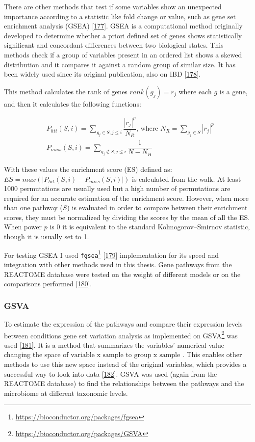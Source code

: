 \documentclass[
  12pt,
  a4paper,
  twoside,
  openright]{book}
\DeclareRobustCommand{\href}[2]{#2\footnote{\url{#1}}}
\begin{document}
There are other methods that test if some variables show an unexpected importance according to a statistic like fold change or value, such as gene set enrichment analysis (GSEA) {[}\protect\hyperlink{ref-subramanian2005}{177}{]}.
GSEA is a computational method originally developed to determine whether a priori defined set of genes shows statistically significant and concordant differences between two biological states.
This methods check if a group of variables present in an ordered list shows a skewed distribution and it compares it against a random group of similar size.
It has been widely used since its original publication, also on IBD {[}\protect\hyperlink{ref-protiva2016}{178}{]}.

This method calculates the rank of genes \(rank(g_j)=r_j\) where each \(g\) is a gene, and then it calculates the following functions:

\[
\begin{aligned}
& P_{hit}(S, i) = \sum_{g_j \in S, j \leq i}\dfrac{|r_j|^p}{N_R} \text{, where } N_R = \sum_{g_j \in S}|r_j|^p \\
& P_{miss}(S, i) = \sum_{g_j \not \in S, j \leq i}\dfrac{1}{N - N_H}
\end{aligned}
\]

With these values the enrichment score (ES) defined as: \(ES=max(|P_{hit}(S, i)-P_{miss}(S, i)\vert)\) is calculated from the walk.
At least 1000 permutations are usually used but a high number of permutations are required for an accurate estimation of the enrichment score.
However, when more than one pathway (\(S\)) is evaluated in order to compare between their enrichment scores, they must be normalized by dividing the scores by the mean of all the ES.
When power \(p\) is 0 it is equivalent to the standard Kolmogorov--Smirnov statistic, though it is usually set to 1.

For testing GSEA I used \href{https://bioconductor.org/packages/fgsea}{\texttt{fgsea}} {[}\protect\hyperlink{ref-korotkevich2021}{179}{]} implementation for its speed and integration with other methods used in this thesis.
Gene pathways from the REACTOME database were tested on the weight of different models or on the comparisons performed {[}\protect\hyperlink{ref-fabregat2016}{180}{]}.

\hypertarget{gsva}{%
\subsubsection{GSVA}\label{gsva}}

To estimate the expression of the pathways and compare their expression levels between conditions gene set variation analysis as implemented on \href{https://bioconductor.org/packages/GSVA}{GSVA} was used {[}\protect\hyperlink{ref-huxe4nzelmann2013}{181}{]}.
It is a method that summarizes the variables' numerical value changing the space of \(\text{variable x sample}\) to \(\text{group x sample}\) .
This enables other methods to use this new space instead of the original variables, which provides a successful way to look into data {[}\protect\hyperlink{ref-escudero-hernuxe1ndez2021}{182}{]}.
GSVA was used (again from the REACTOME database) to find the relationships between the pathways and the microbiome at different taxonomic levels.
\end{document}

